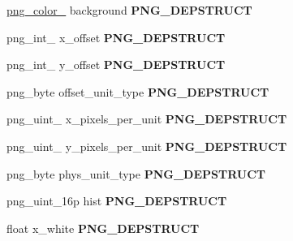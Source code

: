\begin{DoxyCompactItemize}
\item 
\hypertarget{structpng__info__struct_a412cb3a79238a173719e2803ddf328bd}{\hyperlink{structpng__color__16__struct}{png\-\_\-color\-\_} background {\bfseries P\-N\-G\-\_\-\-D\-E\-P\-S\-T\-R\-U\-C\-T}}\label{structpng__info__struct_a412cb3a79238a173719e2803ddf328bd}

\item 
\hypertarget{structpng__info__struct_af16b1e04d8a38208cb092e9f36da32a1}{png\-\_\-int\-\_ x\-\_\-offset {\bfseries P\-N\-G\-\_\-\-D\-E\-P\-S\-T\-R\-U\-C\-T}}\label{structpng__info__struct_af16b1e04d8a38208cb092e9f36da32a1}

\item 
\hypertarget{structpng__info__struct_a34fea44c406a0b887459818f73ffd038}{png\-\_\-int\-\_ y\-\_\-offset {\bfseries P\-N\-G\-\_\-\-D\-E\-P\-S\-T\-R\-U\-C\-T}}\label{structpng__info__struct_a34fea44c406a0b887459818f73ffd038}

\item 
\hypertarget{structpng__info__struct_a486aa9581c54722455d04a49fdbb8278}{png\-\_\-byte offset\-\_\-unit\-\_\-type {\bfseries P\-N\-G\-\_\-\-D\-E\-P\-S\-T\-R\-U\-C\-T}}\label{structpng__info__struct_a486aa9581c54722455d04a49fdbb8278}

\item 
\hypertarget{structpng__info__struct_a34fee261da8e0c1ca23b80f4d1ad6e94}{png\-\_\-uint\-\_ x\-\_\-pixels\-\_\-per\-\_\-unit {\bfseries P\-N\-G\-\_\-\-D\-E\-P\-S\-T\-R\-U\-C\-T}}\label{structpng__info__struct_a34fee261da8e0c1ca23b80f4d1ad6e94}

\item 
\hypertarget{structpng__info__struct_a1a07ec3f8e9df781f3e3256afd587f85}{png\-\_\-uint\-\_ y\-\_\-pixels\-\_\-per\-\_\-unit {\bfseries P\-N\-G\-\_\-\-D\-E\-P\-S\-T\-R\-U\-C\-T}}\label{structpng__info__struct_a1a07ec3f8e9df781f3e3256afd587f85}

\item 
\hypertarget{structpng__info__struct_a77109f218d008efcd3925926212e68be}{png\-\_\-byte phys\-\_\-unit\-\_\-type {\bfseries P\-N\-G\-\_\-\-D\-E\-P\-S\-T\-R\-U\-C\-T}}\label{structpng__info__struct_a77109f218d008efcd3925926212e68be}

\item 
\hypertarget{structpng__info__struct_a5cd2d6bcebc7dd30e2ed64603b181338}{png\-\_\-uint\-\_\-16p hist {\bfseries P\-N\-G\-\_\-\-D\-E\-P\-S\-T\-R\-U\-C\-T}}\label{structpng__info__struct_a5cd2d6bcebc7dd30e2ed64603b181338}

\item 
\hypertarget{structpng__info__struct_ae3c58d4c32caf275c469b841c13c6178}{float x\-\_\-white {\bfseries P\-N\-G\-\_\-\-D\-E\-P\-S\-T\-R\-U\-C\-T}}\label{structpng__info__struct_ae3c58d4c32caf275c469b841c13c6178}


\end{DoxyCompactItemize}
